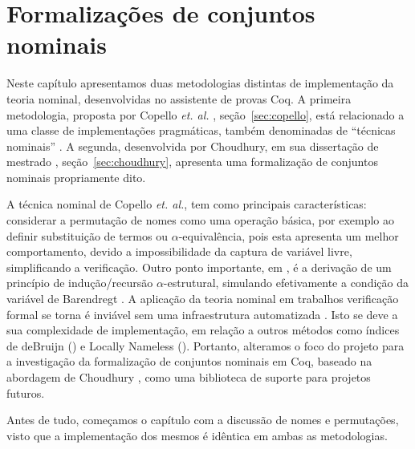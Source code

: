 \chapter{Formalizações de conjuntos nominais}\label{chp:formalizacao}

Neste capítulo apresentamos duas metodologias distintas de implementação da teoria nominal, desenvolvidas no assistente de provas Coq. A primeira metodologia, proposta por Copello \textit{et. al.} \cite{Copello2016}, seção~\ref{sec:copello}, está relacionado a uma classe de implementações pragmáticas, também denominadas de ``técnicas nominais'' \cite{Aydemir2007,Copello2016,Tasistro2015,Copello2018,Ambal2020}. A segunda, desenvolvida por Choudhury, em sua dissertação de mestrado \cite{Choudhury2015}, seção~\ref{sec:choudhury}, apresenta uma formalização de conjuntos nominais propriamente dito. 

A técnica nominal de Copello \textit{et. al.}, tem como principais características: considerar a permutação de nomes como uma operação básica, por exemplo ao definir substituição de termos ou $\alpha$-equivalência, pois esta apresenta um melhor comportamento, devido a impossibilidade da captura de variável livre, simplificando a verificação. Outro ponto importante, em \cite{Copello2016}, é a derivação de um princípio de indução/recursão $\alpha$-estrutural, simulando efetivamente a condição da variável de Barendregt \cite[BVC]{Barendregt2012}.
A aplicação da teoria nominal em trabalhos verificação formal se torna é inviável sem uma infraestrutura automatizada \cite{Aydemir2008}. Isto se deve a sua complexidade de implementação, em relação a outros métodos como índices de deBruijn () e Locally Nameless ().
Portanto, alteramos o foco do projeto para a investigação da formalização de conjuntos nominais em Coq, baseado na abordagem de Choudhury \cite{Choudhury2015}, como uma biblioteca de suporte para projetos futuros.

Antes de tudo, começamos o capítulo com a discussão de nomes e permutações, visto que a implementação dos mesmos é idêntica em ambas as metodologias.

